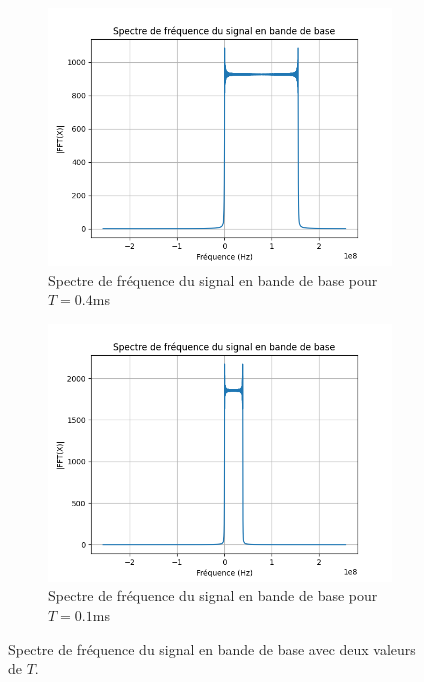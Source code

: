\begin{figure}[H]
  \centering
  \begin{subfigure}[b]{0.45\textwidth}
    \includegraphics[width=\textwidth]{Pictures/SPCTR_SST.png}
    \caption{Spectre de fréquence du signal en bande de base pour $T=0.4$ms}
  \end{subfigure}
  \hfill
  \begin{subfigure}[b]{0.45\textwidth}
    \includegraphics[width=\textwidth]{Pictures/SPCTR_SST(1).png}
    \caption{Spectre de fréquence du signal en bande de base pour $T=0.1$ms}
  \end{subfigure}
  \caption{Spectre de fréquence du signal en bande de base avec deux valeurs de $T$.}
  \label{fig:spectre_bbs}
\end{figure}

